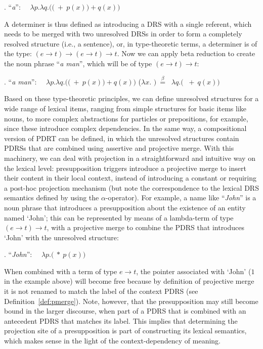 \ex. ``\textit{a}'':~~ 
  $\lambda p.\lambda q.(($$~+~p(x))+q(x))$

A determiner is thus defined as introducing a DRS with a single referent,
which needs to be merged with two unresolved DRSs in order to form
a completely resolved structure (i.e., a sentence), or, in type-theoretic
terms, a determiner is of the type: $(e\rightarrow t)\rightarrow
(e\rightarrow t) \rightarrow t$. Now we can apply beta reduction to create
the noun phrase ``\textit{a man}'', which will be of type $(e\rightarrow t)
\rightarrow t$:

\ex. ``\textit{a man}'':~~ 
  $\lambda p.\lambda q.(($$~+~p(x))+q(x))$ ($\lambda x.$
  $)~\stackrel{\beta}{=}~$ $\lambda q.($
  $~+~q(x))$ 

Based on these type-theoretic principles, we can define unresolved
structures for a wide range of lexical items, ranging from simple structures
for basic items like nouns, to more complex abstractions for particles or
prepositions, for example, since these introduce complex dependencies.  In
the same way, a compositional version of PDRT can be defined, in which the
unresolved structures contain PDRSs that are combined using assertive and
projective merge. With this machinery, we can deal with projection in
a straightforward and intuitive way on the lexical level: presupposition
triggers introduce a projective merge to insert their content in their local
context, instead of introducing a constant
 or requiring
a post-hoc projection mechanism 
(but note the correspondence to the lexical DRS semantics defined by
 using the $\alpha$-operator).  For example,
a name like ``\emph{John}'' is a noun phrase that introduces
a presupposition about the existence of an entity named `John'; this can be
represented by means of a lambda-term of type $(e\rightarrow t)\rightarrow
t$, with a projective merge to combine the PDRS that introduces `John' with
the unresolved structure:

\ex. ``\textit{John}'':~~ 
  $\lambda p.($$~*~p(x))$

When combined with a term of type $e\rightarrow t$, the pointer associated
with `John' ($1$ in the example above) will become free because by
definition of projective merge it is not renamed to match the label of the
context PDRS (see Definition~\ref{def:pmerge}). Note, however, that the
presupposition may still become bound in the larger discourse, when part of
a PDRS that is combined with an antecedent PDRS that matches its label. This
implies that determining the projection site of a presupposition is part of
constructing its lexical semantics, which makes sense in the light of the
context-dependency of meaning. 

